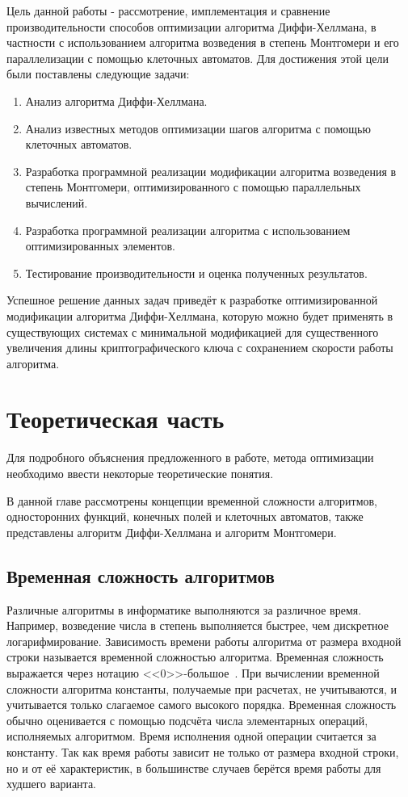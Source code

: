 \documentclass[times,specification,annotation]{itmo-student-thesis}
\begin{document}
Цель данной работы - рассмотрение, имплементация и сравнение производительности способов оптимизации алгоритма
Диффи-Хеллмана, в частности с использованием алгоритма возведения в степень Монтгомери и его параллелизации
с помощью клеточных автоматов.
Для достижения этой цели были поставлены следующие задачи:
\begin{enumerate}[label=\arabic*.]
    \item Анализ алгоритма Диффи-Хеллмана.
    \item Анализ известных методов оптимизации шагов алгоритма с помощью клеточных автоматов.
    \item Разработка программной реализации модификации алгоритма возведения в степень Монтгомери, оптимизированного с помощью параллельных вычислений.
    \item Разработка программной реализации алгоритма с использованием оптимизированных элементов.
    \item Тестирование производительности и оценка полученных результатов.
\end{enumerate}
Успешное решение данных задач приведёт к разработке оптимизированной модификации алгоритма Диффи-Хеллмана,
которую можно будет применять в существующих системах с минимальной модификацией для существенного увеличения длины
криптографического ключа с сохранением скорости работы алгоритма.


\chapter{Теоретическая часть}

\startrelatedwork
Для подробного объяснения предложенного в работе, метода оптимизации необходимо ввести некоторые теоретические понятия.

В данной главе рассмотрены концепции временной сложности алгоритмов, односторонних функций, конечных полей и клеточных автоматов,
также представлены алгоритм Диффи-Хеллмана и алгоритм Монтгомери.

\section{Временная сложность алгоритмов}\label{sec:asympt}

Различные алгоритмы в информатике выполняются за различное время.
Например, возведение числа в степень выполняется быстрее, чем дискретное логарифмирование.
Зависимость времени работы алгоритма от размера входной строки называется временной сложностью алгоритма.
Временная сложность выражается через нотацию <<$\textit{0}$>>-большое~\cite{knu97}.
При вычислении временной сложности алгоритма константы, получаемые при расчетах, не учитываются, и учитывается только слагаемое самого высокого порядка.
Временная сложность обычно оценивается с помощью подсчёта числа элементарных операций, исполняемых алгоритмом.
Время исполнения одной операции считается за константу.
Так как время работы зависит не только от размера входной строки, но и от её характеристик,
в большинстве случаев берётся время работы для худшего варианта.
\end{document}
